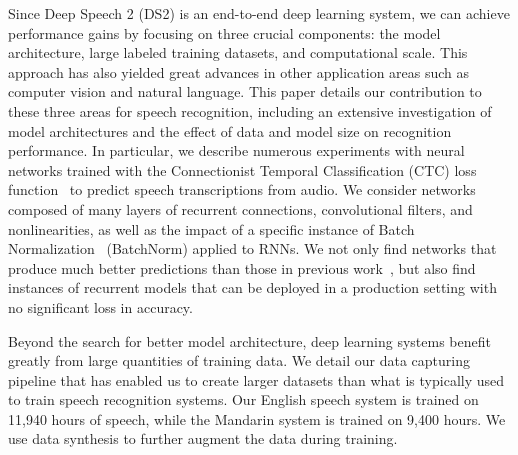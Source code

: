 Since {Deep Speech 2} (DS2) is an end-to-end deep learning system, we can
achieve performance gains by focusing on three crucial components: the model
architecture, large labeled training datasets, and computational scale. This
approach has also yielded great advances in other application areas such as
computer vision and natural language. This paper details our contribution to
these three areas for speech recognition, including an extensive investigation
of model architectures and the effect of data and model size on recognition
performance. In particular, we describe numerous experiments with neural
networks trained with the Connectionist Temporal Classification (CTC) loss
function~\cite{graves2006} to predict speech transcriptions from audio. We
consider networks composed of many layers of recurrent connections,
convolutional filters, and nonlinearities, as well as the impact of a specific
instance of Batch Normalization~\cite{ioffe2015batch} (BatchNorm) applied to
RNNs. We not only find networks that produce much better predictions than those
in previous work~\cite{hannun2014deepspeech}, but also find instances of
recurrent models that can be deployed in a production setting with no
significant loss in accuracy.

Beyond the search for better model architecture, deep learning systems benefit
greatly from large quantities of training data. We detail our data capturing
pipeline that has enabled us to create larger datasets than what is typically
used to train speech recognition systems. Our English speech system is trained
on 11,940 hours of speech, while the Mandarin system is trained on 9,400 hours.
We use data synthesis to further augment the data during training.

